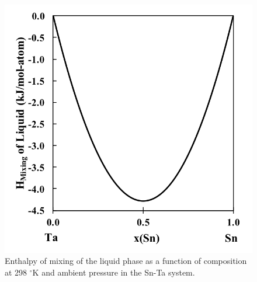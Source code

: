 \pagebreak
\begin{figure}[H]
	\centering
	\includegraphics[width=\textwidth]{Chapter-4/Figures/HofMix.png}
	\caption{Enthalpy of mixing of the liquid phase as a function of composition at 298 $^\circ$K and ambient pressure in the Sn-Ta system.}
	\label{Ch4-figure:HofMix}
\end{figure}
